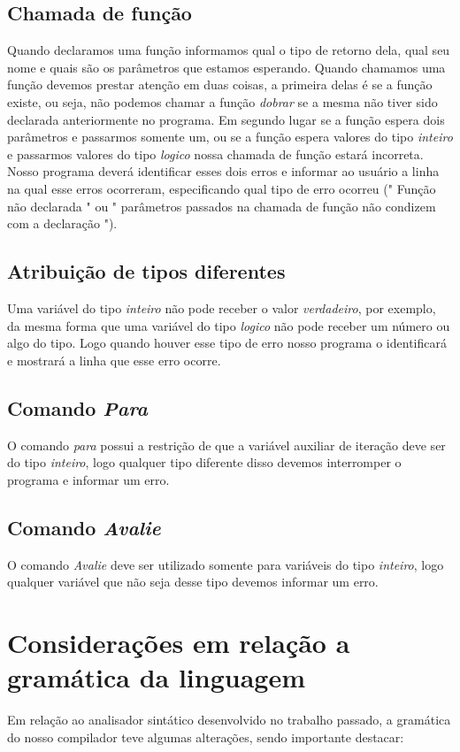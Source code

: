 \documentclass[
12pt,				%
a4paper,			%
english,			%
french,				%
spanish,			%
brazil,				%
article
]{abntex2}
\begin{document}
\subsection{Chamada de função}
Quando declaramos uma função informamos qual o tipo de retorno dela, qual seu nome e quais são os parâmetros que estamos esperando. Quando chamamos uma função devemos prestar atenção em duas coisas, a primeira delas é se a função existe, ou seja, não podemos chamar a função \textit{dobrar} se a mesma não tiver sido declarada anteriormente no programa. Em segundo lugar se a função espera dois parâmetros e passarmos somente um, ou se a função espera valores do tipo \textit{inteiro} e passarmos valores do tipo \textit{logico} nossa chamada de função estará incorreta. Nosso programa deverá identificar esses dois erros e informar ao usuário a linha na qual esse erros ocorreram, especificando qual tipo de erro ocorreu (" Função não declarada " ou " parâmetros passados na chamada de função não condizem com a declaração ").

\subsection{Atribuição de tipos diferentes}
Uma variável do tipo \textit{inteiro} não pode receber o valor \textit{verdadeiro}, por exemplo, da mesma forma que uma variável do tipo \textit{logico} não pode receber um número ou algo do tipo. Logo quando houver esse tipo de erro nosso programa o identificará e mostrará a linha que esse erro ocorre.

\subsection{Comando \textit{Para}}
O comando \textit{para} possui a restrição de que a variável auxiliar de iteração deve ser do tipo \textit{inteiro}, logo qualquer tipo diferente disso devemos interromper o programa e informar um erro.

\subsection{Comando \textit{Avalie}}
O comando \textit{Avalie} deve ser utilizado somente para variáveis do tipo \textit{inteiro}, logo qualquer variável que não seja desse tipo devemos informar um erro.

\section{Considerações em relação a gramática da linguagem}
Em relação ao analisador sintático desenvolvido no trabalho passado, a gramática do nosso compilador teve algumas alterações, sendo importante destacar:
\end{document}
